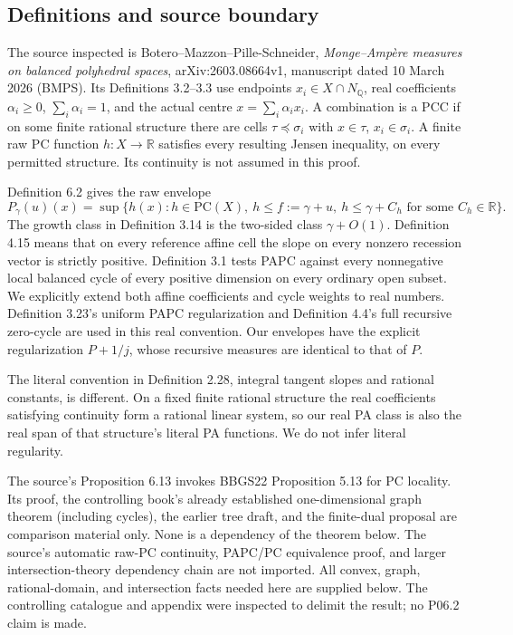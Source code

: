 \documentclass[
  11pt,
]{article}
\begin{document}
\subsection{Definitions and source
boundary}\label{definitions-and-source-boundary}

The source inspected is Botero--Mazzon--Pille-Schneider,
\emph{Monge--Ampère measures on balanced polyhedral spaces},
arXiv:2603.08664v1, manuscript dated 10 March 2026 (BMPS). Its
Definitions 3.2--3.3 use endpoints \(x_i\in X\cap N_\mathbb Q\), real
coefficients \(\alpha_i\geq0\), \(\sum_i\alpha_i=1\), and the actual
centre \(x=\sum_i\alpha_i x_i\). A combination is a PCC if on some
finite rational structure there are cells \(\tau\preceq\sigma_i\) with
\(x\in\tau\), \(x_i\in\sigma_i\). A finite raw PC function
\(h:X\to\mathbb R\) satisfies every resulting Jensen inequality, on
every permitted structure. Its continuity is not assumed in this proof.

Definition 6.2 gives the raw envelope \[
 P_\gamma(u)(x)=\sup\{h(x):h\in\mathrm{PC}(X),\ h\leq f:=\gamma+u,
                 \ h\leq\gamma+C_h\text{ for some }C_h\in\mathbb R\}. \tag{3}
\] The growth class in Definition 3.14 is the two-sided class
\(\gamma+O(1)\). Definition 4.15 means that on every reference affine
cell the slope on every nonzero recession vector is strictly positive.
Definition 3.1 tests PAPC against every nonnegative local balanced cycle
of every positive dimension on every ordinary open subset. We explicitly
extend both affine coefficients and cycle weights to real numbers.
Definition 3.23's uniform PAPC regularization and Definition 4.4's full
recursive zero-cycle are used in this real convention. Our envelopes
have the explicit regularization \(P+1/j\), whose recursive measures are
identical to that of \(P\).

The literal convention in Definition 2.28, integral tangent slopes and
rational constants, is different. On a fixed finite rational structure
the real coefficients satisfying continuity form a rational linear
system, so our real PA class is also the real span of that structure's
literal PA functions. We do not infer literal regularity.

The source's Proposition 6.13 invokes BBGS22 Proposition 5.13 for PC
locality. Its proof, the controlling book's already established
one-dimensional graph theorem (including cycles), the earlier tree
draft, and the finite-dual proposal are comparison material only. None
is a dependency of the theorem below. The source's automatic raw-PC
continuity, PAPC/PC equivalence proof, and larger intersection-theory
dependency chain are not imported. All convex, graph, rational-domain,
and intersection facts needed here are supplied below. The controlling
catalogue and appendix were inspected to delimit the result; no P06.2
claim is made.
\end{document}
